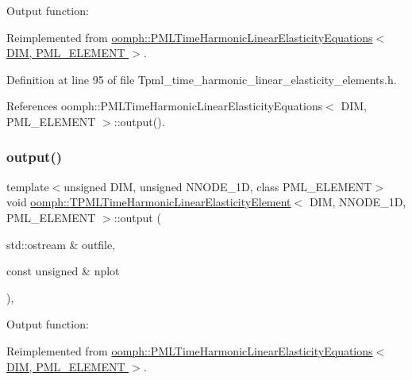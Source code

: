 Output function\+: 



Reimplemented from \hyperlink{classoomph_1_1PMLTimeHarmonicLinearElasticityEquations_ab033b94bb8665cb782011cf4f12824e9}{oomph\+::\+P\+M\+L\+Time\+Harmonic\+Linear\+Elasticity\+Equations$<$ D\+I\+M, P\+M\+L\+\_\+\+E\+L\+E\+M\+E\+N\+T $>$}.



Definition at line 95 of file Tpml\+\_\+time\+\_\+harmonic\+\_\+linear\+\_\+elasticity\+\_\+elements.\+h.



References oomph\+::\+P\+M\+L\+Time\+Harmonic\+Linear\+Elasticity\+Equations$<$ D\+I\+M, P\+M\+L\+\_\+\+E\+L\+E\+M\+E\+N\+T $>$\+::output().

\mbox{\label{classoomph_1_1TPMLTimeHarmonicLinearElasticityElement_ac28193016db74abe10b78b871ba7b74a}} 
\subsubsection{\texorpdfstring{output()}{output()}\hspace{0.1cm}{\footnotesize\ttfamily [2/4]}}
{\footnotesize\ttfamily template$<$unsigned D\+IM, unsigned N\+N\+O\+D\+E\+\_\+1D, class P\+M\+L\+\_\+\+E\+L\+E\+M\+E\+NT$>$ \\
void \hyperlink{classoomph_1_1TPMLTimeHarmonicLinearElasticityElement}{oomph\+::\+T\+P\+M\+L\+Time\+Harmonic\+Linear\+Elasticity\+Element}$<$ D\+IM, N\+N\+O\+D\+E\+\_\+1D, P\+M\+L\+\_\+\+E\+L\+E\+M\+E\+NT $>$\+::output (\begin{DoxyParamCaption}\item[{std\+::ostream \&}]{outfile,  }\item[{const unsigned \&}]{nplot }\end{DoxyParamCaption})\hspace{0.3cm}{\ttfamily [inline]}, {\ttfamily [virtual]}}



Output function\+: 



Reimplemented from \hyperlink{classoomph_1_1PMLTimeHarmonicLinearElasticityEquations_a0c7fe3f1d343009a7289fd85becc58a6}{oomph\+::\+P\+M\+L\+Time\+Harmonic\+Linear\+Elasticity\+Equations$<$ D\+I\+M, P\+M\+L\+\_\+\+E\+L\+E\+M\+E\+N\+T $>$}.



